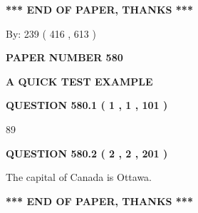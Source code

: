 \documentclass[12pt]{article}
\begin{document}
 
   
   
 \vspace{0.2in}
 
   
   
   
   
\vspace{1.0in} 
{\textbf{\large{ *** END OF PAPER, THANKS *** }}} 
   
   
\hspace{1.0in} By: 
 239 ( 416 ,  613 )
   
   
   
   
\newpage 
\setcounter{page}{ 
   580001 } 
   
   
   
   
 {\textbf{ \Large{ PAPER NUMBER  580  }}}
   
   
\vspace{0.2in}
   
   
   
   
   
   
 \vspace{0.2in}
{\LARGE {\textbf{ A QUICK TEST EXAMPLE}}}
   
   
  
\vspace{0.2in}
  
{\textbf{\Large{QUESTION
580.1 
 ( 1 , 1 , 101 )
}}}
  
  
 
 
\noindent{}

89
 
 
  
\vspace{0.2in}
  
{\textbf{\Large{QUESTION
580.2 
 ( 2 , 2 , 201 )
}}}
  
  
 
 
\noindent{}
 
 
The capital of Canada is Ottawa.
 
 
 
 
   
   
 \vspace{0.2in}
 
   
   
   
   
\vspace{1.0in} 
{\textbf{\large{ *** END OF PAPER, THANKS *** }}} 
   
\end{document}
